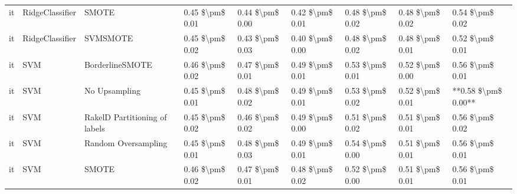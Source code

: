 \begin{tabular}{lllllllll}
      it &                 RidgeClassifier &                         SMOTE & 0.45 \$\textbackslash pm\$ 0.01 &           0.44 \$\textbackslash pm\$ 0.00 &       0.42 \$\textbackslash pm\$ 0.01 &        0.48 \$\textbackslash pm\$ 0.02 &                         0.48 \$\textbackslash pm\$ 0.02 &     0.54 \$\textbackslash pm\$ 0.02 \\
      it &                 RidgeClassifier &                      SVMSMOTE & 0.45 \$\textbackslash pm\$ 0.02 &           0.43 \$\textbackslash pm\$ 0.03 &       0.40 \$\textbackslash pm\$ 0.00 &        0.48 \$\textbackslash pm\$ 0.02 &                         0.48 \$\textbackslash pm\$ 0.01 &     0.52 \$\textbackslash pm\$ 0.01 \\
      it &                             SVM &               BorderlineSMOTE & 0.46 \$\textbackslash pm\$ 0.02 &           0.47 \$\textbackslash pm\$ 0.01 &       0.49 \$\textbackslash pm\$ 0.01 &        0.53 \$\textbackslash pm\$ 0.01 &                         0.52 \$\textbackslash pm\$ 0.00 &     0.56 \$\textbackslash pm\$ 0.01 \\
      it &                             SVM &                 No Upsampling & 0.45 \$\textbackslash pm\$ 0.01 &           0.48 \$\textbackslash pm\$ 0.02 &       0.49 \$\textbackslash pm\$ 0.01 &        0.53 \$\textbackslash pm\$ 0.02 &                         0.52 \$\textbackslash pm\$ 0.01 & **0.58 \$\textbackslash pm\$ 0.00** \\
      it &                             SVM & RakelD Partitioning of labels & 0.45 \$\textbackslash pm\$ 0.02 &           0.46 \$\textbackslash pm\$ 0.02 &       0.49 \$\textbackslash pm\$ 0.00 &        0.51 \$\textbackslash pm\$ 0.02 &                         0.51 \$\textbackslash pm\$ 0.01 &     0.56 \$\textbackslash pm\$ 0.02 \\
      it &                             SVM &           Random Oversampling & 0.45 \$\textbackslash pm\$ 0.01 &           0.48 \$\textbackslash pm\$ 0.03 &       0.49 \$\textbackslash pm\$ 0.01 &        0.54 \$\textbackslash pm\$ 0.00 &                         0.51 \$\textbackslash pm\$ 0.01 &     0.56 \$\textbackslash pm\$ 0.01 \\
      it &                             SVM &                         SMOTE & 0.46 \$\textbackslash pm\$ 0.02 &           0.47 \$\textbackslash pm\$ 0.01 &       0.48 \$\textbackslash pm\$ 0.02 &        0.52 \$\textbackslash pm\$ 0.00 &                         0.51 \$\textbackslash pm\$ 0.01 &     0.56 \$\textbackslash pm\$ 0.01 \\

\end{tabular}
